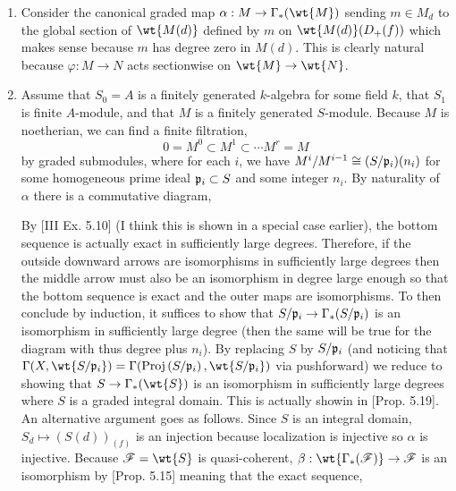 \documentclass[12pt]{article}
\begin{document}
\begin{enumerate}
\item Consider the canonical graded map $\alpha : M \to \Gamma_*(\wt{M})$ sending $m \in M_d$ to the global section of $\wt{M(d)}$ defined by $m$ on $\wt{M(d)}(D_+(f))$ which makes sense because $m$ has degree zero in $M(d)$. This is clearly natural because $\varphi : M \to N$ acts sectionwise on $\wt{M} \to \wt{N}$.

\item Assume that $S_0 = A$ is a finitely generated $k$-algebra for some field $k$, that $S_1$ is finite $A$-module, and that $M$ is a finitely generated $S$-module. Because $M$ is noetherian, we can find a finite filtration,
\[ 0 = M^0 \subset M^1 \subset \cdots M^r = M \]
by graded submodules, where for each $i$, we have $M^i/M^{i-1} \cong (S/\mathfrak{p}_i)(n_i)$ for some homogeneous prime ideal $\mathfrak{p}_i \subset S$ and some integer $n_i$. By naturality of $\alpha$ there is a commutative diagram,
\begin{center}
\end{center}
By [III Ex. 5.10] (I think this is shown in a special case earlier), the bottom sequence is actually exact in sufficiently large degrees.
Therefore, if the outside downward arrows are isomorphisms in sufficiently large degrees then the middle arrow must also be an isomorphism in degree large enough so that the bottom sequence is exact and the outer maps are isomorphisms. To then conclude by induction, it suffices to show that $S/\mathfrak{p}_i \to \Gamma_*(S/\mathfrak{p}_i)$ is an isomorphism in sufficiently large degree (then the same will be true for the diagram with thus degree plus $n_i$). By replacing $S$ by $S / \mathfrak{p}_i$ (and noticing that $\Gamma(X, \wt{S/\p_i}) = \Gamma(\Proj{S/\p_i}, \wt{S/\p_i})$ via pushforward) we reduce to showing that $S \to \Gamma_*(\wt{S})$ is an isomorphism in sufficiently large degrees where $S$ is a graded integral domain. This is actually showin in [Prop. 5.19]. An alternative argument goes as follows. Since $S$ is an integral domain, $S_d \mapsto (S(d))_{(f)}$ is an injection because localization is injective so $\alpha$ is injective. Because $\F = \wt{S}$ is quasi-coherent, $\beta : \wt{\Gamma_*(\F)} \to \F$ is an isomorphism by [Prop. 5.15] meaning that the exact sequence,

\end{enumerate}
\end{document}
